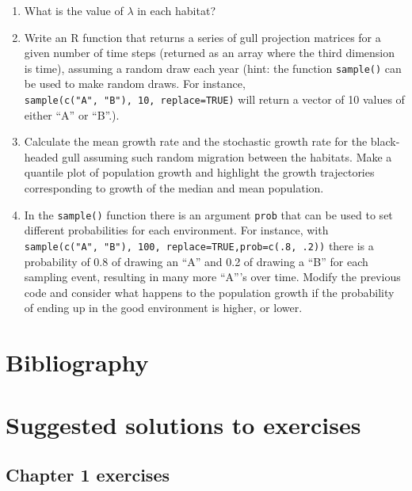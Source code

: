 \documentclass[
]{book}
\newlength{\cslhangindent}
\newlength{\cslentryspacingunit} %
\newenvironment{CSLReferences}[2] %
 {%
  \setlength{\parindent}{0pt}
  \ifodd #1
  \let\oldpar\par
  \def\par{\hangindent=\cslhangindent\oldpar}
  \fi
  \setlength{\parskip}{#2\cslentryspacingunit}
 }%
 {}
\begin{document}
\begin{enumerate}
\def\labelenumi{\arabic{enumi}.}
\item
  What is the value of \(\lambda\) in each habitat?
\item
  Write an R function that returns a series of gull projection matrices for a given number of time steps (returned as an array where the third dimension is time), assuming a random draw each year (hint: the function \texttt{sample()} can be used to make random draws. For instance, \texttt{sample(c("A",\ "B"),\ 10,\ replace=TRUE)} will return a vector of 10 values of either ``A'' or ``B''.).
\item
  Calculate the mean growth rate and the stochastic growth rate for the black-headed gull assuming such random migration between the habitats. Make a quantile plot of population growth and highlight the growth trajectories corresponding to growth of the median and mean population.
\item
  In the \texttt{sample()} function there is an argument \texttt{prob} that can be used to set different probabilities for each environment. For instance, with \texttt{sample(c("A",\ "B"),\ 100,\ replace=TRUE,prob=c(.8,\ .2))} there is a probability of 0.8 of drawing an ``A'' and 0.2 of drawing a ``B'' for each sampling event, resulting in many more ``A'''s over time. Modify the previous code and consider what happens to the population growth if the probability of ending up in the good environment is higher, or lower.
\end{enumerate}

\hypertarget{06-references}{%
\chapter*{Bibliography}\label{06-references}}

\hypertarget{refs}{}
\begin{CSLReferences}{0}{0}
\end{CSLReferences}

\hypertarget{appendix-appendix}{%
\appendix}


\hypertarget{s09-Solutions}{%
\chapter{Suggested solutions to exercises}\label{s09-Solutions}}

\hypertarget{chapter-1-exercises}{%
\section{Chapter 1 exercises}\label{chapter-1-exercises}}
\end{document}
